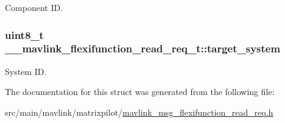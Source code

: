 Component I\+D. 

\hypertarget{struct____mavlink__flexifunction__read__req__t_a936f700ccd88d872d9e1dceae4b3fa13}{
\subsubsection[{target\+\_\+system}]{\setlength{\rightskip}{0pt plus 5cm}uint8\+\_\+t \+\_\+\+\_\+mavlink\+\_\+flexifunction\+\_\+read\+\_\+req\+\_\+t\+::target\+\_\+system}}\label{struct____mavlink__flexifunction__read__req__t_a936f700ccd88d872d9e1dceae4b3fa13}


System I\+D. 



The documentation for this struct was generated from the following file\+:\begin{DoxyCompactItemize}
\item 
src/main/mavlink/matrixpilot/\hyperlink{mavlink__msg__flexifunction__read__req_8h}{mavlink\+\_\+msg\+\_\+flexifunction\+\_\+read\+\_\+req.\+h}\end{DoxyCompactItemize}
